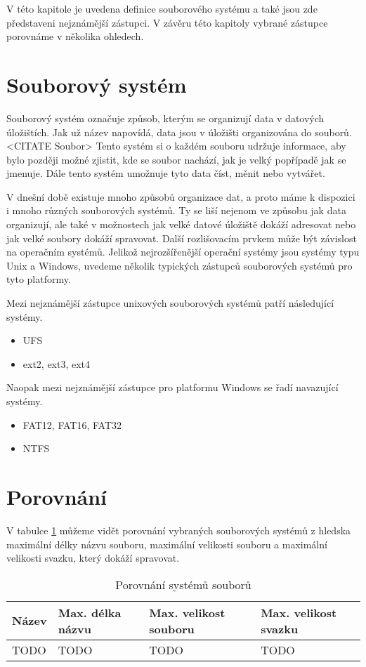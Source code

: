 V této kapitole je uvedena definice souborového systému a také jsou zde představeni nejznámější zástupci. V závěru této kapitoly vybrané zástupce porovnáme v několika ohledech.
\section{Souborový systém}
    \label{fs}
    Souborový systém označuje způsob, kterým se organizují data v datových úložištích. Jak už název napovídá, data jsou v úložišti organizována do souborů. <CITATE Soubor>
    Tento systém si o každém souboru udržuje informace, aby bylo později možné zjistit, kde se soubor nachází, jak je velký popřípadě jak se jmenuje. Dále tento systém umožnuje tyto data číst, měnit nebo vytvářet.

    V dnešní době existuje mnoho způsobů organizace dat, a proto máme k dispozici i mnoho různých souborových systémů. Ty se liší nejenom ve způsobu jak data organizují,
    ale také v možnostech jak velké datové úložiště dokáží adresovat nebo jak velké soubory dokáží spravovat. Další rozlišovacím prvkem může být závislost na operačním systémů.
    Jelikož nejrozšířenější operační systémy jsou systémy typu Unix a Windows, uvedeme několik typických zástupců souborových systémů pro tyto platformy.

    Mezi nejznámější zástupce unixových souborových systémů patří následující systémy.
    \begin{itemize}
      \item UFS
      \item ext2, ext3, ext4
    \end{itemize}

    Naopak mezi nejznámější zástupce pro platformu Windows se řadí navazující systémy.
    \begin{itemize}
      \item FAT12, FAT16, FAT32
      \item NTFS
    \end{itemize}

\section{Porovnání}
    V tabulce \ref{fscompare} můžeme vidět porovnání vybraných souborových systémů z hledska maximální délky názvu souboru, maximální velikosti souboru a maximální velikosti svazku, který dokáží spravovat.
    \begin{table}[]
    \centering
    \caption{Porovnání systémů souborů}
    \label{fscompare}
    \begin{tabular}{|l|l|l|l|}
    \hline
    Název & Max. délka názvu & Max. velikost souboru & Max. velikost svazku \\ \hline
    TODO & TODO & TODO & TODO \\ \hline
    \end{tabular}
    \end{table} 